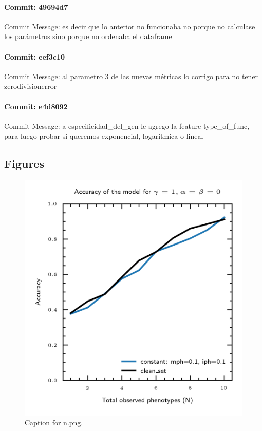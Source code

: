 \documentclass{article}
\begin{document}
\paragraph{Commit: 49694d7}
Commit Message: es decir que lo anterior no funcionaba no porque no calculase los parámetros sino porque no ordenaba el dataframe

\paragraph{Commit: eef3c10}
Commit Message: al parametro 3 de las nuevas métricas lo corrigo para no tener zerodivisionerror

\paragraph{Commit: e4d8092}
Commit Message: a especificidad_del_gen le agrego la feature type_of_func, para luego probar si queremos exponencial, logarítmica o lineal

\subsection{Figures}

\begin{figure}[h] \centering \includegraphics{n.png} \caption{Caption for n.png.} \end{figure}
\end{document}
